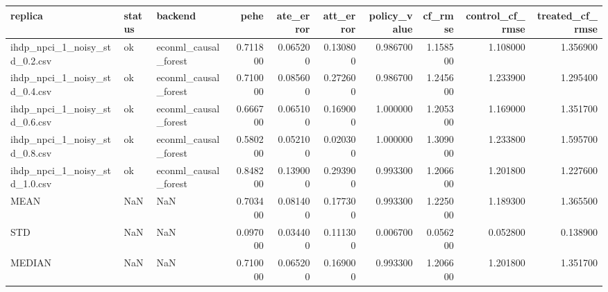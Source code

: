 \begin{tabular}{lllrrrrrrr}
\toprule
replica & status & backend & pehe & ate_error & att_error & policy_value & cf_rmse & control_cf_rmse & treated_cf_rmse \\
\midrule
ihdp_npci_1_noisy_std_0.2.csv & ok & econml_causal_forest & 0.711800 & 0.065200 & 0.130800 & 0.986700 & 1.158500 & 1.108000 & 1.356900 \\
ihdp_npci_1_noisy_std_0.4.csv & ok & econml_causal_forest & 0.710000 & 0.085600 & 0.272600 & 0.986700 & 1.245600 & 1.233900 & 1.295400 \\
ihdp_npci_1_noisy_std_0.6.csv & ok & econml_causal_forest & 0.666700 & 0.065100 & 0.169000 & 1.000000 & 1.205300 & 1.169000 & 1.351700 \\
ihdp_npci_1_noisy_std_0.8.csv & ok & econml_causal_forest & 0.580200 & 0.052100 & 0.020300 & 1.000000 & 1.309000 & 1.233800 & 1.595700 \\
ihdp_npci_1_noisy_std_1.0.csv & ok & econml_causal_forest & 0.848200 & 0.139000 & 0.293900 & 0.993300 & 1.206600 & 1.201800 & 1.227600 \\
MEAN & NaN & NaN & 0.703400 & 0.081400 & 0.177300 & 0.993300 & 1.225000 & 1.189300 & 1.365500 \\
STD & NaN & NaN & 0.097000 & 0.034400 & 0.111300 & 0.006700 & 0.056200 & 0.052800 & 0.138900 \\
MEDIAN & NaN & NaN & 0.710000 & 0.065200 & 0.169000 & 0.993300 & 1.206600 & 1.201800 & 1.351700 \\
\bottomrule
\end{tabular}

